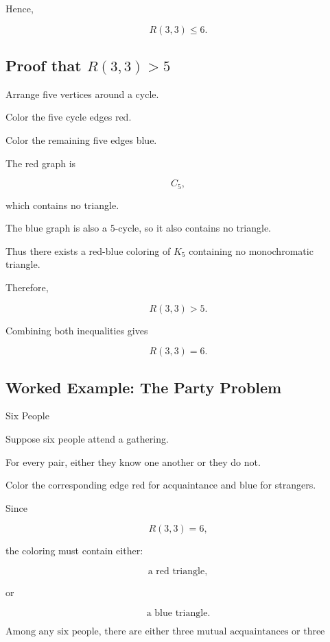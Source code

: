 Hence,

\[
\boxed{
R(3,3)\leq6.
}
\]

\subsection{Proof that \(R(3,3)>5\)}
\label{subsec:ramsey-33-lower}

Arrange five vertices around a cycle.

Color the five cycle edges red.

Color the remaining five edges blue.

The red graph is

\[
C_5,
\]

which contains no triangle.

The blue graph is also a \(5\)-cycle, so it also contains no triangle.

Thus there exists a red-blue coloring of \(K_5\) containing no
monochromatic triangle.

Therefore,

\[
\boxed{
R(3,3)>5.
}
\]

Combining both inequalities gives

\[
\boxed{
R(3,3)=6.
}
\]

\subsection{Worked Example: The Party Problem}
\label{subsec:worked-party-problem}

\begin{workedexamplebox}{Six People}

Suppose six people attend a gathering.

For every pair, either they know one another or they do not.

Color the corresponding edge red for acquaintance and blue for
strangers.

Since

\[
R(3,3)=6,
\]

the coloring must contain either:

\[
\text{a red triangle},
\]

or

\[
\text{a blue triangle}.
\]

\begin{answerbox}
\[
\boxed{
\text{Among any six people, there are either three mutual acquaintances
or three mutual strangers.}
}
\]
\end{answerbox}

\end{workedexamplebox}


